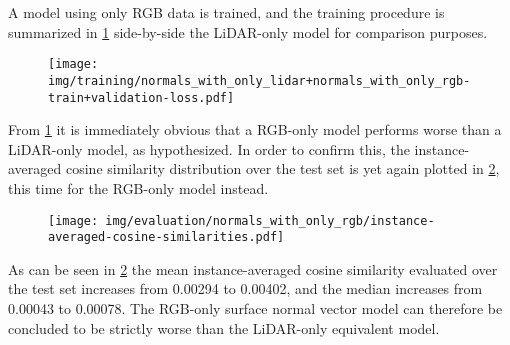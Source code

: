 A model using only RGB data is trained, and the training procedure is summarized in \cref{fig:rgb-training} side-by-side the LiDAR-only model for comparison purposes.
%
\begin{figure}[H]
  \texttt{[image: img/training/normals\_with\_only\_lidar+normals\_with\_only\_rgb-train+validation-loss.pdf]}
  \label{fig:rgb-training}
\end{figure}
\noindent
From \cref{fig:rgb-training} it is immediately obvious that a RGB-only model performs worse than a LiDAR-only model, as hypothesized.
In order to confirm this, the instance-averaged cosine similarity distribution over the test set is yet again plotted in \cref{fig:rgb-test-distribution}, this time for the RGB-only model instead.
%
\begin{figure}
  \texttt{[image: img/evaluation/normals\_with\_only\_rgb/instance-averaged-cosine-similarities.pdf]}
  \label{fig:rgb-test-distribution}
\end{figure}
%
As can be seen in \cref{fig:rgb-test-distribution} the mean instance-averaged cosine similarity evaluated over the test set increases from \num{0.00294} to \num{0.00402}, and the median increases from \num{0.00043} to \num{0.00078}.
The RGB-only surface normal vector model can therefore be concluded to be strictly worse than the LiDAR-only equivalent model.

